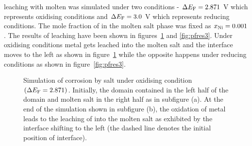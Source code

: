  leaching with molten  was simulated under two conditions - $\Delta E_{\ce{F}} = 2.871$ \si{\volt} which represents oxidising conditions and $\Delta E_{\ce{F}} = 3.0$ \si{\volt} which represents reducing conditions. The mole fraction of  in the molten salt phase was fixed as $x_{\ce{Ni}} = 0.001$. The results of  leaching have been shown in figures~\ref{fig:pfres2} and \ref{fig:pfres3}. Under oxidising conditions  metal gets leached into the molten salt and the interface moves to the left as shown in figure~\ref{fig:pfres2} while the opposite happens under reducing conditions as shown in  figure~\ref{fig:pfres3}. 
\begin{figure}[!ht]
    \hfill
    \caption[Simulation of  corrosion by  salt under oxidising condition $\left(\Delta E_{\ce{F}} = 2.871\right)$.]{Simulation of  corrosion by  salt under oxidising condition $\left(\Delta E_{\ce{F}} = 2.871\right)$. Initially, the domain contained  in the left half of the domain and molten salt in the right half as in subfigure (a). At the end of the simulation shown in subfigure (b), the oxidation of  metal leads to the leaching of  into the molten salt as exhibited by the interface shifting to the left (the dashed line denotes the initial position of interface).}
    \label{fig:pfres2}
\end{figure}

